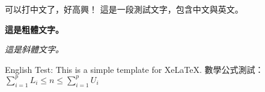 \documentclass{article}
\begin{document}
可以打中文了，好高興！  
這是一段測試文字，包含中文與英文。  

\textbf{這是粗體文字。}

\textit{這是斜體文字。} 

English Test: This is a simple template for XeLaTeX.  
數學公式測試：$\displaystyle\sum_{i=1}^p L_i \leq n \leq \sum_{i=1}^p U_i$
\end{document}
